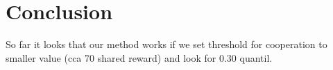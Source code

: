 \chapter*{Conclusion}
So far it looks that our method works if we set threshold for cooperation to smaller value (cca 70 shared reward) and look for 0.30 quantil.
